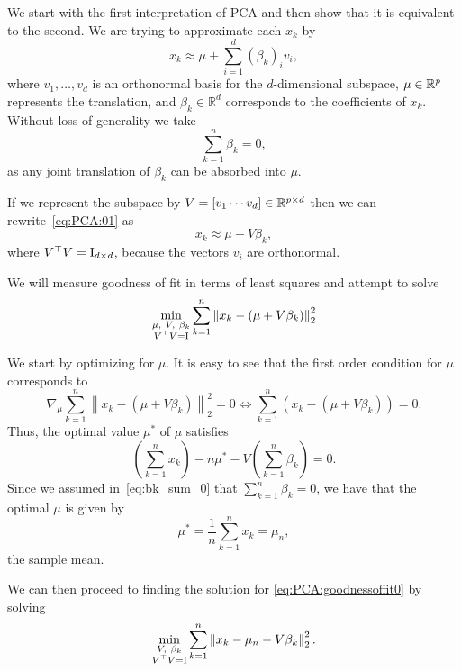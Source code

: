 We start with the first interpretation of PCA and then show that it is equivalent to the second. We are trying to approximate each $x_k$ by
\begin{equation}\label{eq:PCA:01}
 x_k \approx \mu + \sum_{i=1}^d \left(\beta_k\right)_iv_i,
\end{equation}
where $v_1,\dots,v_d$ is an orthonormal basis for the $d$-dimensional subspace, $\mu \in \mathbb{R}^p$ represents the translation, and $\beta_k \in \mathbb{R}^d$ corresponds to the coefficients of $x_k$. Without loss of generality we take
\begin{equation}\label{eq:bk_sum_0}
\sum_{k=1}^n \beta_k = 0,
\end{equation}
as any joint translation of $\beta_k$ can be absorbed into $\mu$.

If we represent the subspace by $V = [v_1\cdots v_d]\in\mathbb{R}^{p\times d}$ then we can rewrite~\eqref{eq:PCA:01} as
\begin{equation}\label{eq:PCA:01}
 x_k \approx \mu + V\beta_k,
\end{equation}
where $V^\top  V=\operatorname{I}_{d\times d}$, because the vectors $v_i$ are orthonormal.

We will measure goodness of fit in terms of least squares and attempt to solve
\begin{equation}\label{eq:PCA:goodnessoffit0}
 \min_{\substack{\mu,\ V,\ \beta_k \\ V^\top  V=\operatorname{I}}} \sum_{k=1}^n \left\| x_k - \left( \mu + V\beta_k \right)  \right\|_2^2
\end{equation}

We start by optimizing for $\mu$. It is easy to see that the first order condition for $\mu$ corresponds to
\[
 \nabla_\mu \sum_{k=1}^n \left\| x_k - \left( \mu + V\beta_k \right)  \right\|_2^2 = 0 \Longleftrightarrow \sum_{k=1}^n \left( x_k - \left( \mu + V\beta_k \right) \right) = 0.
\]
Thus, the optimal value $\mu^\ast$ of $\mu$ satisfies
\[
\left( \sum_{k=1}^n x_k \right) - n\mu^\ast - V\left( \sum_{k=1}^n \beta_k \right)=0.
\]
Since we assumed in~\eqref{eq:bk_sum_0} that $\sum_{k=1}^n \beta_k = 0$, we have that the optimal $\mu$ is given by
\[
 \mu^\ast = \frac1n \sum_{k=1}^n x_k = \mu_n,
\]
the sample mean.

We can then proceed to finding the solution for \eqref{eq:PCA:goodnessoffit0} by solving
\begin{equation}\label{eq:PCA:goodnessoffit1}
 \min_{\substack{V,\ \beta_k \\ V^\top  V=\operatorname{I}}} \sum_{k=1}^n \left\| x_k - \mu_n -  V\beta_k   \right\|_2^2.
\end{equation}

